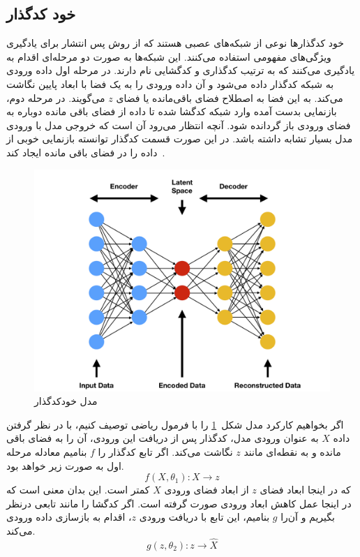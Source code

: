 \documentclass[12pt,a4paper]{report}
\begin{document}
	\subsection{خود کدگذار}
	خود کدگذار‌ها نوعی از شبکه‌های عصبی هستند که از روش پس انتشار برای یادگیری ویژگی‌های مفهومی استفاده می‌کنند. این شبکه‌ها به صورت دو مرحله‌ای اقدام به یادگیری می‌کنند که به ترتیب کدگذاری و کدگشایی نام دارند. در مرحله اول داده ورودی به شبکه کدگذار داده می‌شود و آن داده ورودی را به یک فضا با ابعاد پایین نگاشت می‌کند. به این فضا به اصطلاح فضای باقی‌مانده یا فضای $z$ می‌گویند. در مرحله دوم، بازنمایی بدست آمده وارد شبکه کدگشا شده تا داده از فضای باقی مانده دوباره به فضای ورودی باز گردانده شود. آنچه انتظار می‌رود آن است که خروجی مدل با ورودی مدل بسیار تشابه داشته باشد. در این صورت قسمت کدگذار توانسته بازنمایی خوبی از داده را در فضای باقی مانده ایجاد کند~\cite{BHUVANESHWARI2021131}.
\begin{figure}[!h]
	\begin{center}
		\includegraphics[width=0.6\linewidth]{./images/figures/ae.png}
	\end{center}
	\caption{مدل خودکدگذار}
	\label{fig:ae}
	\centering
\end{figure}

اگر بخواهیم کارکرد مدل شکل~\ref{fig:ae} را با فرمول ریاضی توصیف کنیم، با در نظر گرفتن داده $X$ به عنوان ورودی مدل، کدگذار پس از دریافت این ورودی، آن را به فضای باقی مانده و به نقطه‌ای مانند $z$ نگاشت می‌کند. اگر تابع کدگذار را $f$ بنامیم معادله مرحله اول به صورت زیر خواهد بود.
\begin{equation}
f(X, \theta_1): X \rightarrow z
\end{equation}
که در اینجا ابعاد فضای $z$ از ابعاد فضای ورودی $X$ کمتر است. این بدان معنی است که در اینجا عمل کاهش ابعاد ورودی صورت گرفته است. اگر کدگشا را مانند تابعی درنظر بگیریم و آن‌را $g$ بنامیم، این تابع با دریافت ورودی $z$، اقدام به بازسازی داده ورودی می‌کند.
\begin{equation}
	g(z, \theta_2): z \rightarrow \hat{X}
\end{equation}
\end{document}
